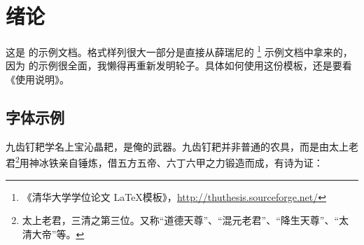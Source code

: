 \chapter{绪论}

这是 \zjuthesis 的示例文档。格式样列很大一部分是直接从薛瑞尼的 \thuthesis\footnote{《清华大学学位论文 \LaTeX 模板》，\url{http://thuthesis.sourceforge.net/}} 示例文档中拿来的，因为 \thuthesis 的示例很全面，我懒得再重新发明轮子。具体如何使用这份模板，还是要看《\zjuthesis 使用说明》。

\section{字体示例}

九齿钉耙学名{\kaiti 上宝沁晶耙}，是俺的武器。九齿钉耙并非普通的农具，而是由太上老君\footnote{太上老君，三清之第三位。又称“道德天尊”、“混元老君”、“降生天尊”、“太清大帝”等。}用神冰铁亲自锤炼，借五方五帝、六丁六甲之力锻造而成，有诗为证：

\vspace{-5mm}

